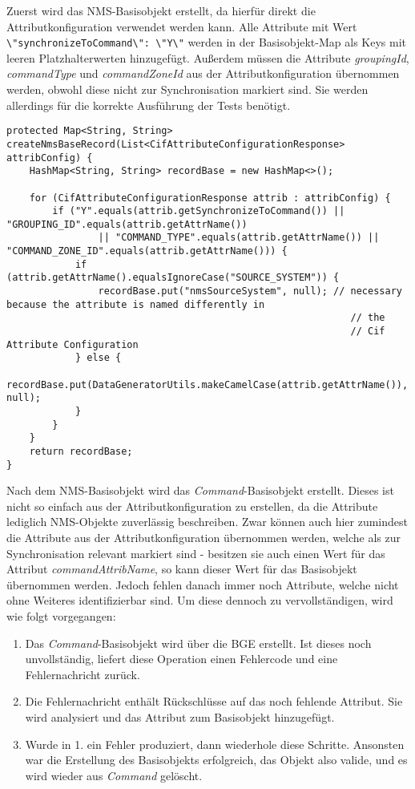 Zuerst wird das \ac{NMS}-Basisobjekt erstellt, da hierfür direkt die Attributkonfiguration verwendet werden kann. Alle Attribute mit Wert \colorbox{background}{\lstinline{\"synchronizeToCommand\": \"Y\"}} werden in der Basisobjekt-Map als Keys mit leeren Platzhalterwerten hinzugefügt. Außerdem müssen die Attribute \textit{groupingId}, \textit{commandType} und \textit{commandZoneId} aus der Attributkonfiguration übernommen werden, obwohl diese nicht zur Synchronisation markiert sind. Sie werden allerdings für die korrekte Ausführung der Tests benötigt.

\begin{lstlisting}[caption=Methode zum Erstellen eines NMS-Basisobjekts, label=nmsBaseRecord,style=Javastyle]
protected Map<String, String> createNmsBaseRecord(List<CifAttributeConfigurationResponse> attribConfig) {
	HashMap<String, String> recordBase = new HashMap<>();

	for (CifAttributeConfigurationResponse attrib : attribConfig) {
		if ("Y".equals(attrib.getSynchronizeToCommand()) || "GROUPING_ID".equals(attrib.getAttrName())
				|| "COMMAND_TYPE".equals(attrib.getAttrName()) || "COMMAND_ZONE_ID".equals(attrib.getAttrName())) {
			if (attrib.getAttrName().equalsIgnoreCase("SOURCE_SYSTEM")) {
				recordBase.put("nmsSourceSystem", null); // necessary because the attribute is named differently in
															// the
															// Cif Attribute Configuration
			} else {
				recordBase.put(DataGeneratorUtils.makeCamelCase(attrib.getAttrName()), null);
			}
		}
	}
	return recordBase;
}
\end{lstlisting}

Nach dem \ac{NMS}-Basisobjekt wird das \textit{Command}-Basisobjekt erstellt. Dieses ist nicht so einfach aus der Attributkonfiguration zu erstellen, da die Attribute lediglich \ac{NMS}-Objekte zuverlässig beschreiben. Zwar können auch hier zumindest die Attribute aus der Attributkonfiguration übernommen werden, welche als zur Synchronisation relevant markiert sind - besitzen sie auch einen Wert für das Attribut \textit{commandAttribName}, so kann dieser Wert für das Basisobjekt übernommen werden. Jedoch fehlen danach immer noch Attribute, welche nicht ohne Weiteres identifizierbar sind. Um diese dennoch zu vervollständigen, wird wie folgt vorgegangen:

\begin{enumerate}
    \item Das \textit{Command}-Basisobjekt wird über die \ac{BGE} erstellt. Ist dieses noch unvollständig, liefert diese Operation einen Fehlercode und eine Fehlernachricht zurück.
    \item Die Fehlernachricht enthält Rückschlüsse auf das noch fehlende Attribut. Sie wird analysiert und das Attribut zum Basisobjekt hinzugefügt.
    \item Wurde in 1. ein Fehler produziert, dann wiederhole diese Schritte. Ansonsten war die Erstellung des Basisobjekts erfolgreich, das Objekt also valide, und es wird wieder aus \textit{Command} gelöscht.
\end{enumerate}

